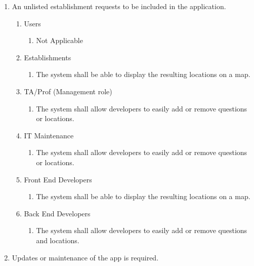 \documentclass[titlepage]{article}
\newcounter{req}
\begin{document}
\begin{enumerate}[{BE1}]
			
			\item An unlisted establishment requests to be included in the application.
			\begin{enumerate}[{VP2.1}]
				
				\item Users
				\begin{enumerate}
					\item Not Applicable 
				\end{enumerate}
				
				\item Establishments
				\begin{enumerate}
					\item The system shall be able to display the resulting locations on a map.
				\end{enumerate}
				
				\item TA/Prof (Management role)
				\begin{enumerate}
					\item The system shall allow developers to easily add or remove questions or locations.
				\end{enumerate}
				
				\item IT Maintenance
				\begin{enumerate}
					\item The system shall allow developers to easily add or remove questions or locations.
				\end{enumerate}
				
				\item Front End Developers
				\begin{enumerate}
					\item The system shall be able to display the resulting locations on a map.				\end{enumerate}
				
				\item Back End Developers
				\begin{enumerate}
					\item The system shall allow developers to easily add or remove questions and locations.
				\end{enumerate}
			\end{enumerate}
			
			\item Updates or maintenance of the app is required.
			\begin{enumerate}[{VP3.1}]
				

\end{enumerate}
\end{enumerate}
\end{document}
